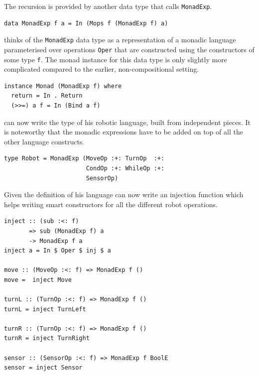 The recursion is provided by another data type that \studname{} 
calls {\tt MonadExp}.

\begin{small}
\begin{verbatim}
data MonadExp f a = In (Mops f (MonadExp f) a)
\end{verbatim}
\end{small}

\studname{} thinks of the {\tt MonadExp} data type as a representation
of a monadic language parameterised over operations {\tt Oper} that
are constructed using the constructors of some type {\tt f}. The monad
instance for this data type is only slightly more complicated compared
to the earlier, non-compositional setting.

\begin{small}
\begin{verbatim}
instance Monad (MonadExp f) where 
  return = In . Return
  (>>=) a f = In (Bind a f) 
\end{verbatim}
\end{small}

\studname{} can now write the type of his robotic language, built
from independent pieces. It is noteworthy that the monadic expressions
have to be added on top of all the other language constructs.

\begin{small}
\begin{verbatim}
type Robot = MonadExp (MoveOp :+: TurnOp  :+:
                       CondOp :+: WhileOp :+:
                       SensorOp)
\end{verbatim}
\end{small}

Given the definition of his language \studname{} can now write an
injection function which helps writing smart constructors for all the
different robot operations.

\begin{small}
\begin{verbatim}
inject :: (sub :<: f) 
       => sub (MonadExp f) a 
       -> MonadExp f a
inject a = In $ Oper $ inj $ a 

move :: (MoveOp :<: f) => MonadExp f ()
move =  inject Move 

turnL :: (TurnOp :<: f) => MonadExp f ()
turnL = inject TurnLeft

turnR :: (TurnOp :<: f) => MonadExp f ()
turnR = inject TurnRight

sensor :: (SensorOp :<: f) => MonadExp f BoolE
sensor = inject Sensor 
\end{verbatim}
\end{small}

